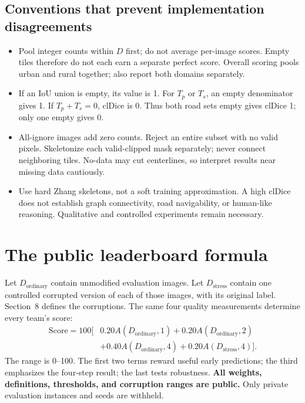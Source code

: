 \documentclass[11pt,letterpaper]{article}
\newcommand{\page}[1]{\clearpage\section{#1}}
\newcommand{\Oset}{D_{\mathrm{ordinary}}}
\newcommand{\Tset}{D_{\mathrm{stress}}}
\begin{document}
\subsection{Conventions that prevent implementation disagreements}
\begin{itemize}
\item Pool integer counts within $D$ first; do not average per-image scores. Empty tiles therefore do not each earn a separate perfect score. Overall scoring pools urban and rural together; also report both domains separately.
\item If an IoU union is empty, its value is 1. For $T_p$ or $T_s$, an empty denominator gives 1. If $T_p+T_s=0$, clDice is 0. Thus both road sets empty gives clDice 1; only one empty gives 0.
\item All-ignore images add zero counts. Reject an entire subset with no valid pixels. Skeletonize each valid-clipped mask separately; never connect neighboring tiles. No-data may cut centerlines, so interpret results near missing data cautiously.
\item Use hard Zhang skeletons, not a soft training approximation. A high clDice does not establish graph connectivity, road navigability, or human-like reasoning. Qualitative and controlled experiments remain necessary.
\end{itemize}

\page{The public leaderboard formula}
Let $\Oset$ contain unmodified evaluation images. Let $\Tset$ contain one controlled corrupted version of each of those images, with its original label. Section~8 defines the corruptions. The same four quality measurements determine every team's score:
\begin{equation}
\boxed{\begin{aligned}
\mathrm{Score}=100\big[&0.20A(\Oset,1)+0.20A(\Oset,2)\\
 &+0.40A(\Oset,4)+0.20A(\Tset,4)\big].
\end{aligned}}\label{eq:score}
\end{equation}
The range is 0--100. The first two terms reward useful early predictions; the third emphasizes the four-step result; the last tests robustness. \textbf{All weights, definitions, thresholds, and corruption ranges are public.} Only private evaluation instances and seeds are withheld.
\end{document}

